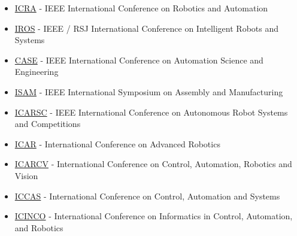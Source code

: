 \begin{itemize}[leftmargin=2em]
	\item \href{http://www.ieee-ras.org/conferences-workshops/fully-sponsored/icra}{ICRA} - IEEE International Conference on Robotics and Automation
	\item \href{http://www.ieee-ras.org/conferences-workshops/financially-co-sponsored/iros}{IROS} - IEEE / RSJ International Conference on Intelligent Robots and Systems
	\item \href{http://www.ieee-ras.org/conferences-workshops/fully-sponsored/case}{CASE} - IEEE International Conference on Automation Science and Engineering
	\item \href{http://www.ieee-ras.org/conferences-workshops/fully-sponsored/isam}{ISAM} - IEEE International Symposium on Assembly and Manufacturing
	\item \href{http://www.ieee-ras.org/conferences-workshops/technically-co-sponsored/robotica}{ICARSC} - IEEE International Conference on Autonomous Robot Systems and Competitions
	\item \href{http://www.ieee-ras.org/conferences-workshops/technically-co-sponsored/icar}{ICAR} - International Conference on Advanced Robotics
	\item \href{http://www.ieee-ras.org/conferences-workshops/technically-co-sponsored/icarcv}{ICARCV} - International Conference on Control, Automation, Robotics and Vision 
	\item \href{http://www.ieee-ras.org/conferences-workshops/technically-co-sponsored/iccas}{ICCAS} - International Conference on Control, Automation and Systems
	\item \href{http://www.ieee-ras.org/conferences-workshops/technically-co-sponsored/icinco}{ICINCO} - International Conference on Informatics in Control, Automation, and Robotics
\end{itemize}
